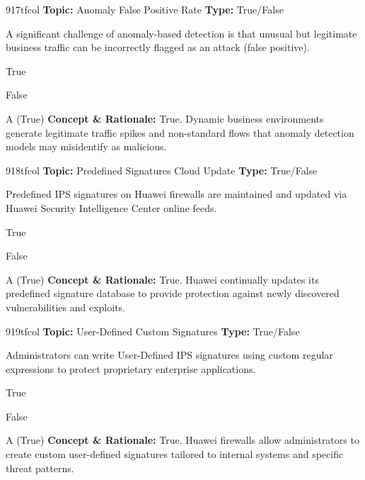 \begin{qcard}{917}{tfcol}
\textcolor{darkslate!75}{\small\textbf{Topic:} Anomaly False Positive Rate \hfill \textbf{Type:} True/False}\vspace{0.4em}\par
A significant challenge of anomaly-based detection is that unusual but legitimate business traffic can be incorrectly flagged as an attack (false positive).
\begin{qoptions}
\item True
\item False
\end{qoptions}
\end{qcard}
\nopagebreak
\begin{explainbox}{A (True)}
\textbf{Concept \& Rationale:} True. Dynamic business environments generate legitimate traffic spikes and non-standard flows that anomaly detection models may misidentify as malicious.
\end{explainbox}

\begin{qcard}{918}{tfcol}
\textcolor{darkslate!75}{\small\textbf{Topic:} Predefined Signatures Cloud Update \hfill \textbf{Type:} True/False}\vspace{0.4em}\par
Predefined IPS signatures on Huawei firewalls are maintained and updated via Huawei Security Intelligence Center online feeds.
\begin{qoptions}
\item True
\item False
\end{qoptions}
\end{qcard}
\nopagebreak
\begin{explainbox}{A (True)}
\textbf{Concept \& Rationale:} True. Huawei continually updates its predefined signature database to provide protection against newly discovered vulnerabilities and exploits.
\end{explainbox}

\begin{qcard}{919}{tfcol}
\textcolor{darkslate!75}{\small\textbf{Topic:} User-Defined Custom Signatures \hfill \textbf{Type:} True/False}\vspace{0.4em}\par
Administrators can write User-Defined IPS signatures using custom regular expressions to protect proprietary enterprise applications.
\begin{qoptions}
\item True
\item False
\end{qoptions}
\end{qcard}
\nopagebreak
\begin{explainbox}{A (True)}
\textbf{Concept \& Rationale:} True. Huawei firewalls allow administrators to create custom user-defined signatures tailored to internal systems and specific threat patterns.
\end{explainbox}

